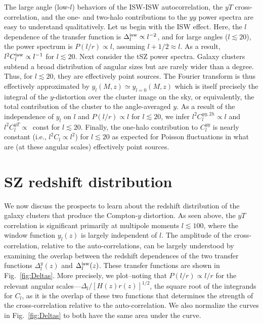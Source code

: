 \documentclass[aps,twocolumn,floats,prd,nofootinbib,10pt,floatfix]{revtex4-1}
\begin{document}
The large angle (low-$l$) behaviors of the ISW-ISW
autocorrelation, the $yT$ cross-correlation, and the one- and
two-halo contributions to the $yy$ power spectra are easy to
understand qualitatively.  Let us begin with the ISW effect.  Here, the
$l$ dependence of the transfer function is $\Delta^{\rm isw}_l
\propto l^{-2}$, and for large angles ($l\lesssim 20$), the power
spectrum is $P(l/r) \propto l$, assuming $l+1/2 \approx l$.  As a result, $l^2C_l^{\rm isw}
\propto l^{-1}$ for $l \lesssim 20$.  Next consider the tSZ
power spectra.  Galaxy clusters subtend a broad distribution of
angular sizes but are rarely wider than a degree.  Thus, for 
$l \lesssim 20$, they are effectively point sources.  The
Fourier transform is thus effectively approximated by $y_l(M,z)
\simeq y_{l=0}(M,z)$ which is itself precisely the integral of
the $y$-distortion over the cluster image on the sky, or
equivalently, the total contribution of the cluster to the
angle-averaged $y$.  As a result of the independence of $y_l$ on
$l$ and $P(l/r) \propto l$ for $l \lesssim 20$, we infer
$l^2 C_l^{yy,2h} \propto l$ and $l^2 C_l^{yT} \propto $~const for
$l\lesssim 20$.  Finally, the one-halo contribution to
$C_l^{yy}$ is nearly constant (i.e., $l^2C_l\propto l^2$) for
$l\lesssim 20$ as expected for Poisson fluctuations in what are
(at these angular scales) effectively point sources.

\section{SZ redshift distribution}
\label{sec:sz}

We now discuss the prospects to learn about the redshift
distribution of the galaxy clusters that produce the Compton-$y$
distortion.  As seen above, the $yT$ correlation is significant
primarily at multipole moments $l \lesssim 100$, where the
window function $y_l(z)$ is largely independent of $l$.  The
amplitude of the cross-correlation, relative to the
auto-correlations, can be largely understood by examining the
overlap between the redshift dependences of the two transfer
functions $\Delta_l^y(z)$ and $\Delta_l^{\rm isw}(z)$.  These
transfer functions are shown in Fig.~\ref{fig:Deltas}.  More
precisely, we plot--noting that $P(l/r) \propto l/r$ for the
relevant angular scales---$\Delta_l/\left[H(z) r(z) \right]^{1/2}$,
the square root of the integrands for $C_l$, as it is the
overlap of these two functions that determines the strength of
the cross-correlation relative to the auto-correlation.  We also
normalize the curves in Fig.~\ref{fig:Deltas} to both have the
same area under the curve.
\end{document}
